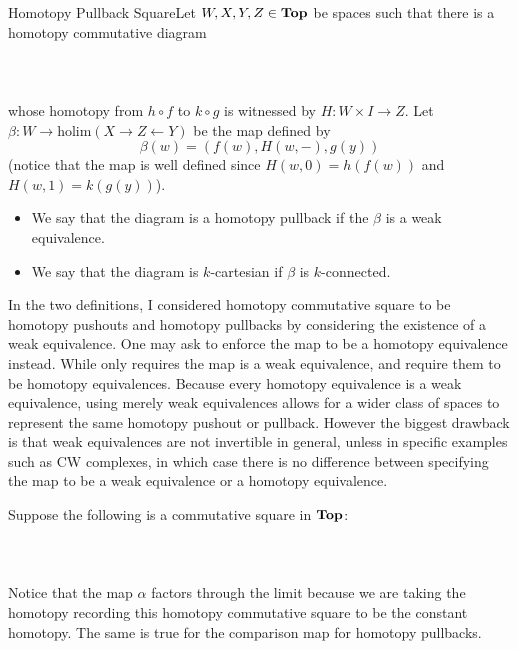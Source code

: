 \documentclass[a4paper]{article}
\begin{document}
\begin{defn}{Homotopy Pullback Square}{}Let $W,X,Y,Z\in\bold{Top}$ be spaces such that there is a homotopy commutative diagram  
 \\~\\  \\~\\
whose homotopy from $h\circ f$ to $k\circ g$ is witnessed by $H:W\times I\to Z$. Let $\beta:W\to\text{holim}(X\rightarrow Z\leftarrow Y)$ be the map defined by $$\beta(w)=(f(w),H(w,-),g(y))$$ (notice that the map is well defined since $H(w,0)=h(f(w))$ and $H(w,1)=k(g(y))$). 
\begin{itemize}
\item We say that the diagram is a homotopy pullback if the $\beta$ is a weak equivalence. 
\item We say that the diagram is $k$-cartesian if $\beta$ is $k$-connected. 
\end{itemize}
\end{defn}

In the two definitions, I considered homotopy commutative square to be homotopy pushouts and homotopy pullbacks by considering the existence of a weak equivalence. One may ask to enforce the map to be a homotopy equivalence instead. While \cite{CHT} only requires the map is a weak equivalence, \cite{IHT} and \cite{MCHT} require them to be homotopy equivalences. Because every homotopy equivalence is a weak equivalence, using merely weak equivalences allows for a wider class of spaces to represent the same homotopy pushout or pullback. However the biggest drawback is that weak equivalences are not invertible in general, unless in specific examples such as CW complexes, in which case there is no difference between specifying the map to be a weak equivalence or a homotopy equivalence. 

Suppose the following is a commutative square in $\bold{Top}$:  
 \\~\\  \\~\\
Notice that the map $\alpha$ factors through the limit because we are taking the homotopy recording this homotopy commutative square to be the constant homotopy. The same is true for the comparison map for homotopy pullbacks. 
\end{document}
